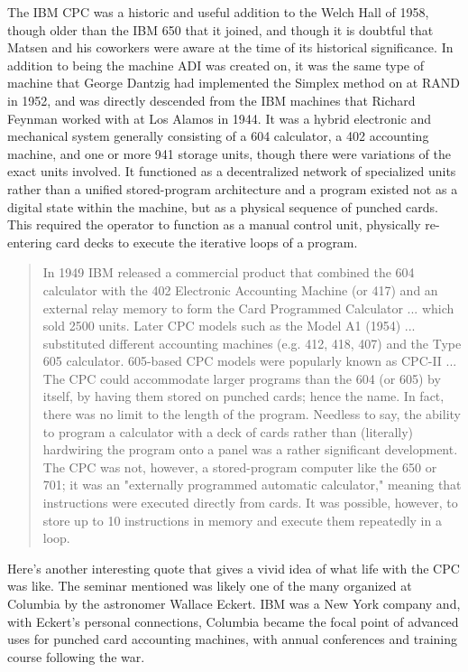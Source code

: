The IBM CPC was a historic and useful addition to the Welch Hall of 1958, though older than the IBM 650 that it joined, and though it is doubtful that Matsen and his coworkers were aware at the time of its historical significance. In addition to being the machine ADI was created on, it was the same type of machine that George Dantzig had implemented the Simplex method on at RAND in 1952, and was directly descended from the IBM machines that Richard Feynman worked with at Los Alamos in 1944. It was a hybrid electronic and mechanical system generally consisting of a 604 calculator, a 402 accounting machine, and one or more 941 storage units, though there were variations of the exact units involved. It functioned as a decentralized network of specialized units rather than a unified stored-program architecture and a program existed not as a digital state within the machine, but as a physical sequence of punched cards. This required the operator to function as a manual control unit, physically re-entering card decks to execute the iterative loops of a program. \cite{sheldonIBMCardProgrammedElectronic1951}

\begin{quotation}
In 1949 IBM released a commercial product that combined the 604 calculator with the 402 Electronic Accounting Machine (or 417) and an external relay memory to form the Card Programmed Calculator ... which sold 2500 units. Later CPC models such as the Model A1 (1954) ... substituted different accounting machines (e.g. 412, 418, 407) and the Type 605 calculator. 605-based CPC models were popularly known as CPC-II ... The CPC could accommodate larger programs than the 604 (or 605) by itself, by having them stored on punched cards; hence the name. In fact, there was no limit to the length of the program. Needless to say, the ability to program a calculator with a deck of cards rather than (literally) hardwiring the program onto a panel was a rather significant development. The CPC was not, however, a stored-program computer like the 650 or 701; it was an "externally programmed automatic calculator," meaning that instructions were executed directly from cards. It was possible, however, to store up to 10 instructions in memory and execute them repeatedly in a loop. \cite{dacruzIBMCardProgrammed2023}
\end{quotation}

Here's another interesting quote that gives a vivid idea of what life with the CPC was like. The seminar mentioned was likely one of the many organized at Columbia by the astronomer Wallace Eckert. IBM was a New York company and, with Eckert's personal connections, Columbia became the focal point of advanced uses for punched card accounting machines, with annual conferences and training course following the war.

